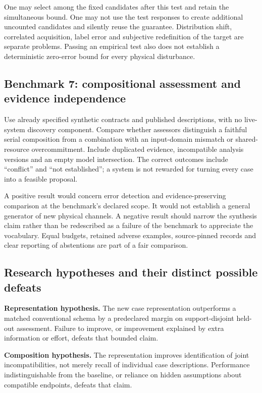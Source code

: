 One may select among the fixed candidates after this test and retain the simultaneous bound. One may not use the test responses to create additional uncounted candidates and silently reuse the guarantee. Distribution shift, correlated acquisition, label error and subjective redefinition of the target are separate problems. Passing an empirical test also does not establish a deterministic zero-error bound for every physical disturbance.

\subsection{Benchmark 7: compositional assessment and evidence independence}
Use already specified synthetic contracts and published descriptions, with no live-system discovery component. Compare whether assessors distinguish a faithful serial composition from a combination with an input-domain mismatch or shared-resource overcommitment. Include duplicated evidence, incompatible analysis versions and an empty model intersection. The correct outcomes include ``conflict'' and ``not established''; a system is not rewarded for turning every case into a feasible proposal.

A positive result would concern error detection and evidence-preserving comparison at the benchmark's declared scope. It would not establish a general generator of new physical channels. A negative result should narrow the synthesis claim rather than be redescribed as a failure of the benchmark to appreciate the vocabulary. Equal budgets, retained adverse examples, source-pinned records and clear reporting of abstentions are part of a fair comparison.

\subsection{Research hypotheses and their distinct possible defeats}
\textbf{Representation hypothesis.} The new case representation outperforms a matched conventional schema by a predeclared margin on support-disjoint held-out assessment. Failure to improve, or improvement explained by extra information or effort, defeats that bounded claim.

\textbf{Composition hypothesis.} The representation improves identification of joint incompatibilities, not merely recall of individual case descriptions. Performance indistinguishable from the baseline, or reliance on hidden assumptions about compatible endpoints, defeats that claim.

